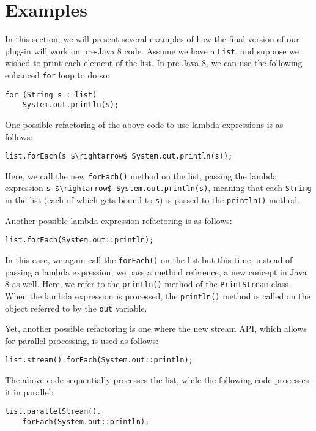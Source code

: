 \section{Examples}

In this section, we will present several examples of how the final version of
our plug-in will work on pre-Java 8 code. Assume we have a \lstinline{List},
and suppose we wished to print each element of the list. In pre-Java 8,
we can use the following enhanced \lstinline{for} loop to do so:

\begin{lstlisting}
for (String s : list) 
    System.out.println(s);  
\end{lstlisting}

One possible refactoring of the above code to use lambda expressions is as follows:
 	
\begin{lstlisting}
list.forEach(s $\rightarrow$ System.out.println(s));  
\end{lstlisting}

Here, we call the new \lstinline{forEach()} method on the list, passing the
lambda expression \lstinline{s $\rightarrow$ System.out.println(s)}, meaning that each
\lstinline{String} in the list (each of which gets bound to \lstinline{s}) is
passed to the \lstinline{println()} method. 

Another possible lambda expression refactoring is as follows:

\begin{lstlisting} 
list.forEach(System.out::println); 
\end{lstlisting}

In this case, we again call the \lstinline{forEach()} on the list but this
time, instead of passing a lambda expression, we pass a method reference, a
new concept in Java 8 as well. Here, we refer to the \lstinline{println()}
method of the \lstinline{PrintStream} class. When the lambda expression is
processed, the \lstinline{println()} method is called on the object referred
to by the \lstinline{out} variable.

Yet, another possible refactoring is one where the new stream API, which
allows for parallel processing, is used as follows:

\begin{lstlisting} 
list.stream().forEach(System.out::println);
\end{lstlisting}

The above code sequentially processes the list, while the following code
processes it in parallel:

\begin{lstlisting} 
list.parallelStream().
    forEach(System.out::println);
\end{lstlisting}
